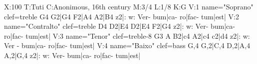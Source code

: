X:100
T:Tuti
C:Anonimous, 16th century
M:3/4
L:1/8
K:G
V:1 name="Soprano" clef=treble
G4 G2|G4 F2|A4 A2|B4 z2|:
w: Ver- bum|ca- ro|fac- tum|est|
V:2 name="Contralto" clef=treble
D4 D2|E4 D2|E4 F2|G4 z2|:
w: Ver- bum|ca- ro|fac- tum|est|
V:3 name="Tenor" clef=treble-8
G3 A B2|c4 A2|c4 c2|d4 z2|:
w: Ver - bum|ca- ro|fac- tum|est|
V:4 name="Baixo" clef=bass
G,4 G,2|C,4 D,2|A,4 A,2|G,4 z2|:
w: Ver- bum|ca- ro|fac- tum|est|
